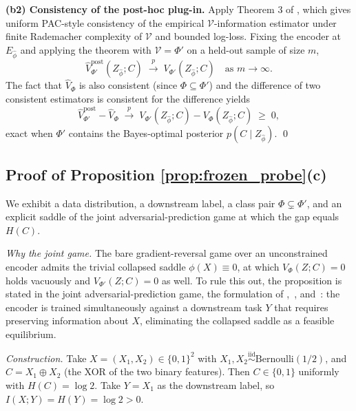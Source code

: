 \documentclass{article}
\begin{document}
\textbf{(b2) Consistency of the post-hoc plug-in.} Apply Theorem 3 of \citet{xu2020theory}, which gives uniform PAC-style consistency of the empirical $\mathcal{V}$-information estimator under finite Rademacher complexity of $\mathcal{V}$ and bounded log-loss. Fixing the encoder at $E_{\hat\phi}$ and applying the theorem with $\mathcal{V} = \Phi'$ on a held-out sample of size $m$,
\begin{equation}
\hat V_{\Phi'}^{\text{post}}(Z_{\hat\phi}; C) \;\xrightarrow{\;p\;}\; V_{\Phi'}(Z_{\hat\phi}; C) \quad \text{as } m \to \infty.
\end{equation}
The fact that $\hat V_\Phi$ is also consistent (since $\Phi \subseteq \Phi'$) and the difference of two consistent estimators is consistent for the difference yields
\begin{equation}
\hat V_{\Phi'}^{\text{post}} - \hat V_\Phi \;\xrightarrow{\;p\;}\; V_{\Phi'}(Z_{\hat\phi}; C) - V_\Phi(Z_{\hat\phi}; C) \;\ge\; 0,
\end{equation}
exact when $\Phi'$ contains the Bayes-optimal posterior $p(C \mid Z_{\hat\phi})$. \qed

\subsection{Proof of Proposition \ref{prop:frozen_probe}(c)}

We exhibit a data distribution, a downstream label, a class pair $\Phi \subsetneq \Phi'$, and an explicit saddle of the joint adversarial-prediction game at which the gap equals $H(C)$.

\textit{Why the joint game.} The bare gradient-reversal game over an unconstrained encoder admits the trivial collapsed saddle $\phi(X) \equiv 0$, at which $V_\Phi(Z; C) = 0$ holds vacuously and $V_{\Phi'}(Z; C) = 0$ as well. To rule this out, the proposition is stated in the joint adversarial-prediction game, the formulation of \citet{xie2017controllable},~\citet{madras2018learning}, and~\citet{zhang2018mitigating}: the encoder is trained simultaneously against a downstream task $Y$ that requires preserving information about $X$, eliminating the collapsed saddle as a feasible equilibrium.

\textit{Construction.} Take $X = (X_1, X_2) \in \{0, 1\}^2$ with $X_1, X_2 \overset{\text{iid}}{\sim} \text{Bernoulli}(1/2)$, and $C = X_1 \oplus X_2$ (the XOR of the two binary features). Then $C \in \{0, 1\}$ uniformly with $H(C) = \log 2$. Take $Y = X_1$ as the downstream label, so $I(X; Y) = H(Y) = \log 2 > 0$.
\end{document}
